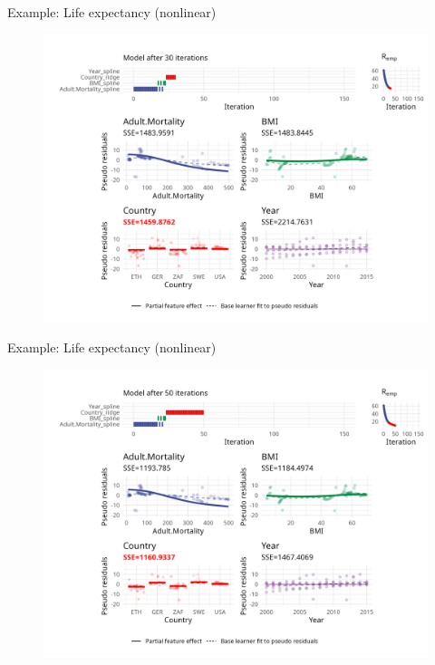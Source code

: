 \begin{frame}{Example: Life expectancy (nonlinear)}
	\begin{figure}
		\centering
		\includegraphics[width=\textwidth]{figures/cwb-anim/fig-iter-0030.png}
	\end{figure}
	\addtocounter{framenumber}{-1}
\end{frame}


\begin{frame}{Example: Life expectancy (nonlinear)}
	\begin{figure}
		\centering
		\includegraphics[width=\textwidth]{figures/cwb-anim/fig-iter-0050.png}
	\end{figure}
	\addtocounter{framenumber}{-1}
\end{frame}


